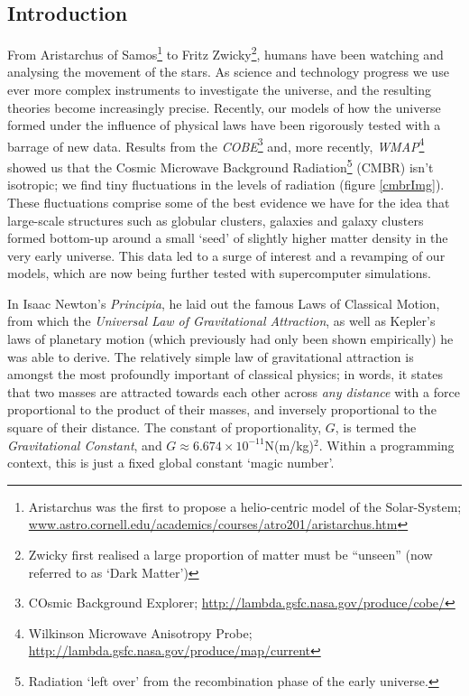 \documentclass[11pt,a4paper]{article}
\begin{document}
\tableofcontents
\listoffigures

\small
\newpage
{}
\begin{center}
\section{Introduction}
\end{center}

From Aristarchus of Samos\footnote{Aristarchus was the first to propose a helio-centric model of the Solar-System; \url{www.astro.cornell.edu/academics/courses/atro201/aristarchus.htm}} to Fritz Zwicky\footnote{Zwicky first realised a large proportion of matter must be ``unseen''\cite{Ty01} (now referred to as `Dark Matter')}, humans have been watching and analysing the movement of the stars.
As science and technology progress we use ever more complex instruments to investigate the universe, and the resulting theories become increasingly precise. Recently, our models of how the universe formed under the influence of physical laws have been rigorously tested with a barrage of new data. Results from the \emph{COBE}\footnote{COsmic Background Explorer; \url{http://lambda.gsfc.nasa.gov/produce/cobe/}} and, more recently, \emph{WMAP}\footnote{Wilkinson Microwave Anisotropy Probe; \url{http://lambda.gsfc.nasa.gov/produce/map/current}} showed us that the Cosmic Microwave Background Radiation\footnote{Radiation `left over' from the recombination phase of the early universe.} (CMBR) isn't isotropic; we find tiny fluctuations in the levels of radiation (figure \ref{cmbrImg}). These fluctuations comprise some of the best evidence we have for the idea that large-scale structures such as globular clusters, galaxies and galaxy clusters formed bottom-up around a small `seed' of slightly higher matter density in the very early universe. This data led to a surge of interest and a revamping of our models, which are now being further tested with supercomputer simulations. 

In Isaac Newton's \emph{Principia}, he laid out the famous Laws of Classical Motion, from which the \emph{Universal Law of Gravitational Attraction}, as well as Kepler's laws of planetary motion (which previously had only been shown empirically) he was able to derive. The relatively simple law of gravitational attraction is amongst the most profoundly important of classical physics; in words, it states that two masses are attracted towards each other across \emph{any distance} with a force proportional to the product of their masses, and inversely proportional to the square of their distance. The constant of proportionality, $G$, is termed the \emph{Gravitational Constant}, and $G\approx6.674\times 10^{-11}$N(m/kg)$^2$. Within a programming context, this is just a fixed global constant `magic number'.
\end{document}
